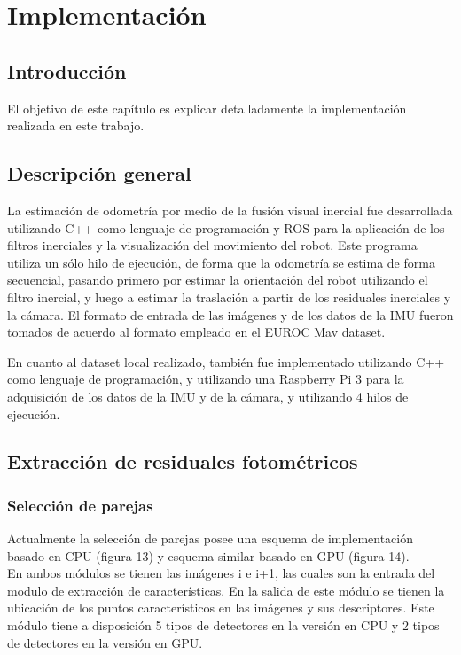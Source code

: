 \chapter{Implementación}
\label{capitulo4}


\section{Introducción}
El objetivo de este capítulo es explicar detalladamente la implementación realizada en este trabajo.
\clearpage



\section{Descripción general}\label{seccion-corte}

La estimación de odometría por medio de la fusión visual inercial fue desarrollada utilizando C++ como lenguaje de programación y ROS para la aplicación de los filtros inerciales y la visualización del movimiento del robot. Este programa utiliza un sólo hilo de ejecución, de forma que la odometría se estima de forma secuencial, pasando primero por estimar la orientación del robot utilizando el filtro inercial, y luego a estimar la traslación a partir de los residuales inerciales y la cámara. El formato de entrada de las imágenes y de los datos de la IMU fueron tomados de acuerdo al formato empleado en el EUROC Mav dataset.

En cuanto al dataset local realizado, también fue implementado utilizando C++ como lenguaje de programación, y utilizando una Raspberry Pi 3 para la adquisición de los datos de la IMU y de la cámara, y utilizando 4 hilos de ejecución.


\section{Extracción de residuales fotométricos}
\subsection{ Selección de parejas }

Actualmente la selección de parejas posee una esquema de  implementación basado en  CPU (figura 13) y  esquema similar basado en GPU (figura 14).\\

En ambos módulos se tienen las imágenes i e i+1, las cuales son la entrada del modulo de extracción de características.
En la salida de este módulo se tienen la ubicación de los puntos característicos en las imágenes y sus descriptores. Este módulo tiene a disposición 5 tipos de detectores en la versión en CPU y 2 tipos de detectores en la versión en GPU.\\

